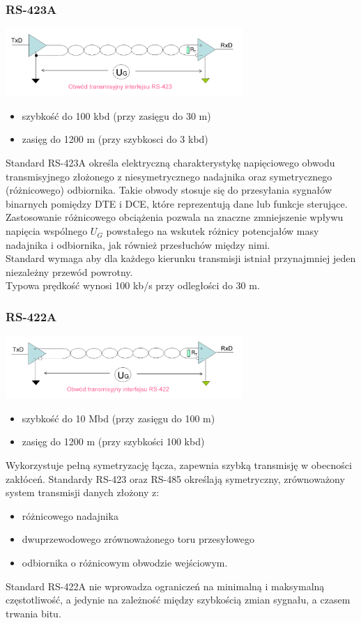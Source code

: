 		\subsubsection{RS-423A}
		\includegraphics[width=9cm]{./wyklady/RS232_12_1.pdf}
		\begin{itemize}
			\item szybkość do 100 kbd (przy zasięgu do 30 m)
			\item zasięg do 1200 m (przy szybkosci do 3 kbd)
		\end{itemize}
		Standard RS-423A określa elektryczną charakterystykę napięciowego obwodu transmisyjnego złożonego z niesymetrycznego nadajnika oraz symetrycznego (różnicowego) odbiornika. Takie obwody stosuje się do przesyłania sygnałów binarnych pomiędzy DTE i DCE, które reprezentują dane lub funkcje sterujące.\\
		Zastosowanie różnicowego obciążenia pozwala na znaczne zmniejszenie wpływu napięcia wspólnego $U_{G}$ powstałego na wskutek różnicy potencjałów masy nadajnika i odbiornika, jak również przesłuchów między nimi.\\
		Standard wymaga aby dla każdego kierunku transmisji istniał przynajmniej jeden niezależny przewód powrotny.\\
		Typowa prędkość wynosi 100 kb/s przy odległości do 30 m.
		\subsubsection{RS-422A}
		\includegraphics[width=9cm]{./wyklady/RS232_12_2.pdf}
		\begin{itemize}
			\item szybkość do 10 Mbd (przy zasięgu do 100 m)
			\item zasięg do 1200 m (przy szybkości 100 kbd)
		\end{itemize}
		Wykorzystuje pełną symetryzację łącza, zapewnia szybką transmisję w obecności zakłóceń. Standardy RS-423 oraz RS-485 określają symetryczny, zrównoważony system transmisji danych złożony z:
		\begin{itemize}
			\item różnicowego nadajnika
			\item dwuprzewodowego zrównoważonego toru przesyłowego
			\item odbiornika o różnicowym obwodzie wejściowym.
		\end{itemize}
		Standard RS-422A nie wprowadza ograniczeń na minimalną i maksymalną częstotliwość, a jedynie na zależność między szybkością zmian sygnału, a czasem trwania bitu.
